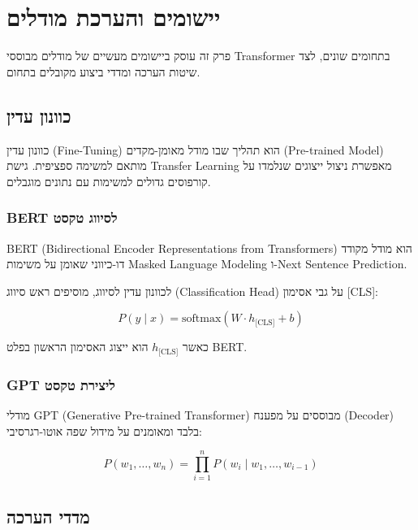 \chapter{יישומים והערכת מודלים}

פרק זה עוסק ביישומים מעשיים של מודלים מבוססי \textenglish{Transformer}
בתחומים שונים, לצד שיטות הערכה ומדדי ביצוע מקובלים בתחום.

\section{כוונון עדין}

כוונון עדין (\textenglish{Fine-Tuning}) הוא תהליך שבו מודל מאומן-מקדים
(\textenglish{Pre-trained Model}) מותאם למשימה ספציפית. גישת \textenglish{Transfer Learning}
מאפשרת ניצול ייצוגים שנלמדו על קורפוסים גדולים למשימות עם נתונים מוגבלים.

\subsection{\textenglish{BERT} לסיווג טקסט}

\textenglish{BERT} (\textenglish{Bidirectional Encoder Representations from Transformers})
הוא מודל מקודד דו-כיווני שאומן על משימות \textenglish{Masked Language Modeling}
ו-\textenglish{Next Sentence Prediction}.

לכוונון עדין לסיווג, מוסיפים ראש סיווג (\textenglish{Classification Head})
על גבי אסימון \textenglish{[CLS]}:

\begin{equation}
    P(y \mid x) = \text{softmax}(W \cdot h_{\text{[CLS]}} + b)
\end{equation}

כאשר \(h_{\text{[CLS]}}\) הוא ייצוג האסימון הראשון בפלט \textenglish{BERT}.

\subsection{\textenglish{GPT} ליצירת טקסט}

מודלי \textenglish{GPT} (\textenglish{Generative Pre-trained Transformer})
מבוססים על מפענח (\textenglish{Decoder}) בלבד ומאומנים על מידול שפה אוטו-רגרסיבי:

\begin{equation}
    P(w_1, \ldots, w_n) = \prod_{i=1}^{n} P(w_i \mid w_1, \ldots, w_{i-1})
\end{equation}

\section{מדדי הערכה}

